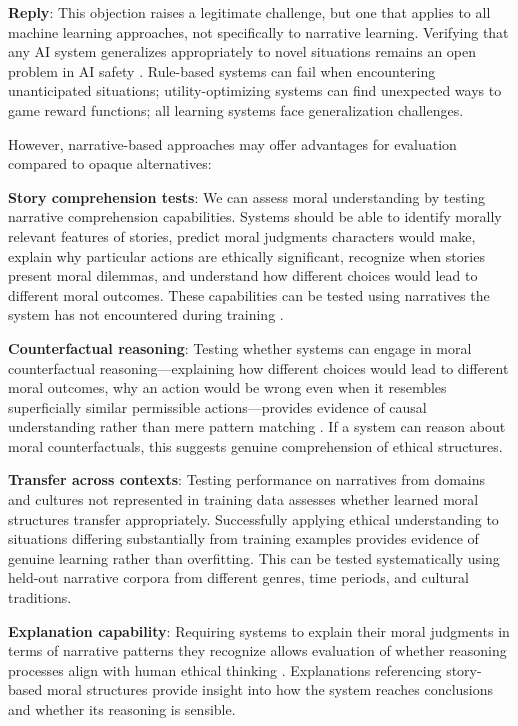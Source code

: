 \documentclass[12pt]{article}
\begin{document}
\textbf{Reply}: This objection raises a legitimate challenge, but one that applies to all machine learning approaches, not specifically to narrative learning. Verifying that any AI system generalizes appropriately to novel situations remains an open problem in AI safety \citep{hendrycks2021unsolved}. Rule-based systems can fail when encountering unanticipated situations; utility-optimizing systems can find unexpected ways to game reward functions; all learning systems face generalization challenges.

However, narrative-based approaches may offer advantages for evaluation compared to opaque alternatives:

\textbf{Story comprehension tests}: We can assess moral understanding by testing narrative comprehension capabilities. Systems should be able to identify morally relevant features of stories, predict moral judgments characters would make, explain why particular actions are ethically significant, recognize when stories present moral dilemmas, and understand how different choices would lead to different moral outcomes. These capabilities can be tested using narratives the system has not encountered during training \citep{forbes2020social, sap2019socialiqa, hendrycks2021aligning}.

\textbf{Counterfactual reasoning}: Testing whether systems can engage in moral counterfactual reasoning---explaining how different choices would lead to different moral outcomes, why an action would be wrong even when it resembles superficially similar permissible actions---provides evidence of causal understanding rather than mere pattern matching \citep{pearl2009causality}. If a system can reason about moral counterfactuals, this suggests genuine comprehension of ethical structures.

\textbf{Transfer across contexts}: Testing performance on narratives from domains and cultures not represented in training data assesses whether learned moral structures transfer appropriately. Successfully applying ethical understanding to situations differing substantially from training examples provides evidence of genuine learning rather than overfitting. This can be tested systematically using held-out narrative corpora from different genres, time periods, and cultural traditions.

\textbf{Explanation capability}: Requiring systems to explain their moral judgments in terms of narrative patterns they recognize allows evaluation of whether reasoning processes align with human ethical thinking \citep{mittelstadt2019explaining}. Explanations referencing story-based moral structures provide insight into how the system reaches conclusions and whether its reasoning is sensible.
\end{document}
